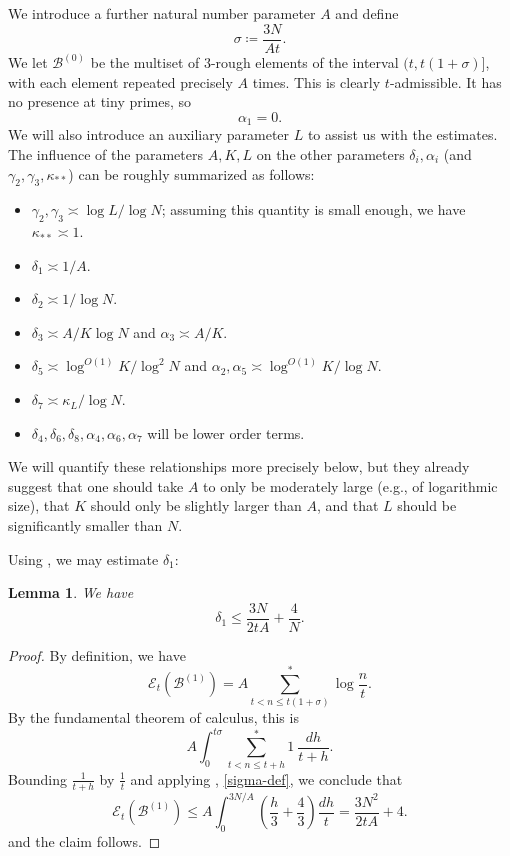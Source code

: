 \documentclass[10pt,a4paper,reqno]{amsart}
\numberwithin{equation}{section}
\theoremstyle{plain}
\newtheorem{lemma}[theorem]{Lemma}
\theoremstyle{definition}
\newcommand\tuple{{\mathcal B}}
\newcommand\excess{{\mathcal{E}}}
\begin{document}
We introduce a further natural number parameter $A$ and define 
\begin{equation}\label{sigma-def}
  \sigma \coloneqq \frac{3N}{At}.
\end{equation}
We let $\tuple^{(0)}$ be the multiset of $3$-rough elements of the interval $(t, t(1+\sigma)]$, with each element repeated precisely $A$ times.  This is clearly $t$-admissible.  It has no presence at tiny primes, so
\begin{equation}\label{alpha1-vanish}
  \alpha_1 = 0.
\end{equation}
We will also introduce an auxiliary parameter $L$ to assist us with the estimates.  The influence of the parameters $A,K,L$ on the other parameters $\delta_i, \alpha_i$ (and $\gamma_2,\gamma_3,\kappa_{**}$) can be roughly summarized as follows:
\begin{itemize}
\item $\gamma_2, \gamma_3 \asymp \log L / \log N$; assuming this quantity is small enough, we have $\kappa_{**} \asymp 1$.
\item $\delta_1 \asymp 1/A$.
\item $\delta_2 \asymp 1/\log N$.
\item $\delta_3 \asymp A/K\log N$ and $\alpha_3 \asymp A/K$.
\item $\delta_5 \asymp \log^{O(1)} K/\log^2 N$ and $\alpha_2, \alpha_5 \asymp \log^{O(1)} K / \log N$.
\item $\delta_7 \asymp \kappa_L/\log N$.
\item $\delta_4, \delta_6, \delta_8, \alpha_4, \alpha_6, \alpha_7$ will be lower order terms.
\end{itemize}
We will quantify these relationships more precisely below, but they already suggest that one should take $A$ to only be moderately large (e.g., of logarithmic size), that $K$ should only be slightly larger than $A$, and that $L$ should be significantly smaller than $N$.

Using , we may estimate $\delta_1$:

\begin{lemma}\label{delta1-bound} We have
$$ \delta_1 \leq \frac{3N}{2tA} + \frac{4}{N}.$$
\end{lemma}

\begin{proof}  By definition, we have
$$ \excess_t(\tuple^{(1)}) = A \sum^*_{t < n \leq t(1+\sigma)} \log \frac{n}{t}.$$
By the fundamental theorem of calculus, this is
$$ A \int_0^{t\sigma} \sum^*_{t < n \leq t+h} 1\ \frac{dh}{t+h}.$$
Bounding $\frac{1}{t+h}$ by $\frac{1}{t}$ and applying , \eqref{sigma-def}, we conclude that
$$
 \excess_t(\tuple^{(1)}) \leq A \int_0^{3N/A} \left(\frac{h}{3} + \frac{4}{3}\right) \frac{dh}{t} = \frac{3N^2}{2tA} + 4.
$$
and the claim follows.
\end{proof}
\end{document}
